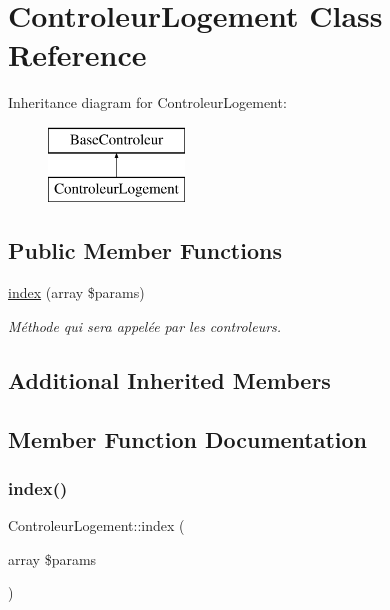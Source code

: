 \hypertarget{class_controleur_logement}{}\section{Controleur\+Logement Class Reference}
\label{class_controleur_logement}
Inheritance diagram for Controleur\+Logement\+:\begin{figure}[H]
\begin{center}
\leavevmode
\includegraphics[height=2.000000cm]{class_controleur_logement}
\end{center}
\end{figure}
\subsection*{Public Member Functions}
\begin{DoxyCompactItemize}
\item 
\hyperlink{class_controleur_logement_a15bf69cbc69fbc4e18c62d462ebf93fb}{index} (array \$params)
\begin{DoxyCompactList}\small\item\em Méthode qui sera appelée par les controleurs. \end{DoxyCompactList}\end{DoxyCompactItemize}
\subsection*{Additional Inherited Members}


\subsection{Member Function Documentation}
\mbox{\label{class_controleur_logement_a15bf69cbc69fbc4e18c62d462ebf93fb}} 
\subsubsection{\texorpdfstring{index()}{index()}}
{\footnotesize\ttfamily Controleur\+Logement\+::index (\begin{DoxyParamCaption}\item[{array}]{\$params }\end{DoxyParamCaption})}



